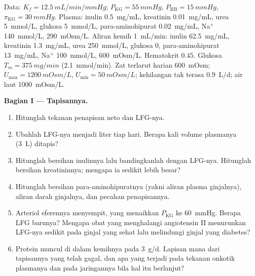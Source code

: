 \begin{problem}
\label{pb:b3:renal-osmoregulation:1}
Data: $K_{f} = \qty{12.5}{mL/min/mmHg}$; $P_{\text{KG}} = \qty{55}{mmHg}$,
$P_{\text{RB}} = \qty{15}{mmHg}$, $\pi_{\text{KG}} = \qty{30}{mmHg}$.
Plasma: inulin \qty{0.5}{mg/mL}, kreatinin \qty{0.01}{mg/mL}, urea
\qty{5}{mmol/L}, glukosa \qty{5}{mmol/L}, para-aminohipurat
\qty{0.02}{mg/mL}, Na$^{+}$ \qty{140}{mmol/L}, 
\qty{290}{mOsm/L}. Aliran kemih \qty{1}{mL/min}: inulin \qty{62.5}{mg/mL},
kreatinin \qty{1.3}{mg/mL}, urea \qty{250}{mmol/L}, glukosa $0$,
para-aminohipurat \qty{13}{mg/mL}, Na$^{+}$ \qty{100}{mmol/L},
 \qty{600}{mOsm/L}. Hematokrit $0.45$. Glukosa $T_{m} =
\qty{375}{mg/min}$ (\qty{2.1}{mmol/min}). Zat terlarut harian \qty{600}{mOsm};
$U_{\max} = \qty{1200}{mOsm/L}$, $U_{\min} = \qty{50}{mOsm/L}$;
kehilangan tak terasa \qty{0.9}{L/d}; air laut \qty{1000}{mOsm/L}.

\medskip
\noindent\textbf{Bagian I --- Tapisannya.}
\begin{enumerate}
  \item Hitunglah tekanan penapisan neto dan LFG-nya.
  \item Ubahlah LFG-nya menjadi liter tiap hari. Berapa kali volume plasmanya
        (\qty{3}{L}) ditapis?
  \item Hitunglah bersihan inulinnya lalu bandingkanlah dengan LFG-nya.
        Hitunglah bersihan kreatininnya; mengapa ia sedikit lebih besar?
  \item Hitunglah bersihan para-aminohipuratnya (yakni aliran plasma
        ginjalnya), aliran darah ginjalnya, dan pecahan penapisannya.
  \item Arteriol eferennya menyempit, yang menaikkan $P_{\text{KG}}$ ke
        \qty{60}{mmHg}. Berapa LFG barunya? Mengapa obat yang menghalangi angiotensin II
        menurunkan LFG-nya sedikit pada ginjal yang sehat lalu melindungi ginjal
        yang diabetes?
  \item Protein muncul di dalam kemihnya pada \qty{3}{g/d}. Lapisan mana dari
        tapisannya yang telah gagal, dan apa yang terjadi pada tekanan onkotik
        plasmanya dan pada jaringannya bila hal itu berlanjut?
\end{enumerate}


\end{problem}

